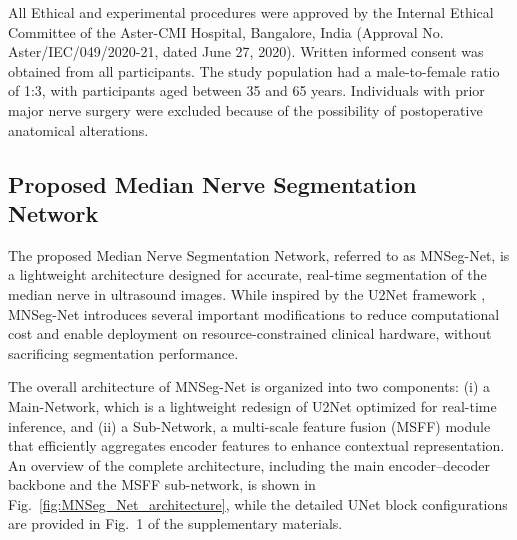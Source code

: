 All Ethical and experimental procedures were approved by the Internal Ethical Committee of the Aster-CMI Hospital, Bangalore, India (Approval No. Aster/IEC/049/2020-21, dated June 27, 2020). Written informed consent was obtained from all participants. The study population had a male-to-female ratio of 1:3, with participants aged between 35 and 65 years. Individuals with prior major nerve surgery were excluded because of the possibility of postoperative anatomical alterations.





\subsection{Proposed Median Nerve Segmentation Network}
\noindent
The proposed Median Nerve Segmentation Network, referred to as MNSeg-Net, is a lightweight architecture designed for accurate, real-time segmentation of the median nerve in ultrasound images. While inspired by the U2Net framework \cite{qin2020u2}, MNSeg-Net introduces several important modifications to reduce computational cost and enable deployment on resource-constrained clinical hardware, without sacrificing segmentation performance.

The overall architecture of MNSeg-Net is organized into two components: (i) a Main-Network, which is a lightweight redesign of U2Net optimized for real-time inference, and (ii) a Sub-Network, a multi-scale feature fusion (MSFF) module that efficiently aggregates encoder features to enhance contextual representation. An overview of the complete architecture, including the main encoder–decoder backbone and the MSFF sub-network, is shown in Fig.~\ref{fig:MNSeg_Net_architecture}, while the detailed UNet block configurations are provided in Fig.~1 of the supplementary materials.




